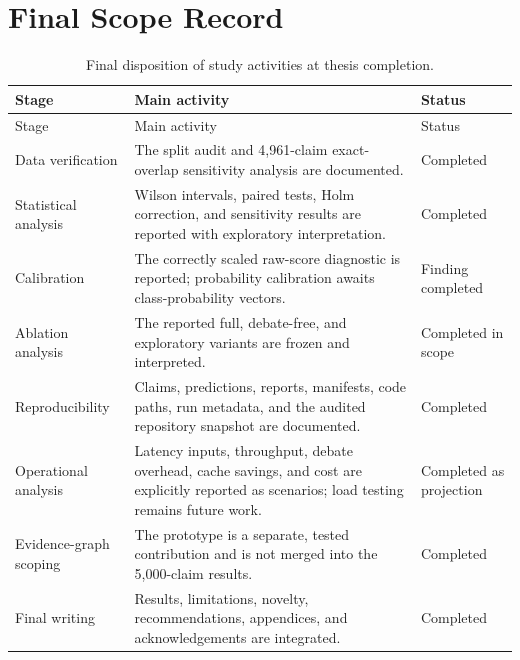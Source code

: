 \documentclass[12pt,a4paper,openany]{report}
\begin{document}
\section{Final Scope Record}
\begin{longtable}{p{3.6cm}p{6.3cm}p{2.6cm}}
\caption{Final disposition of study activities at thesis completion.}\\
\toprule Stage & Main activity & Status \\
\midrule
\endfirsthead
\toprule Stage & Main activity & Status \\
\midrule
\endhead
Data verification & The split audit and 4{,}961-claim exact-overlap sensitivity analysis are documented. & Completed \\
Statistical analysis & Wilson intervals, paired tests, Holm correction, and sensitivity results are reported with exploratory interpretation. & Completed \\
Calibration & The correctly scaled raw-score diagnostic is reported; probability calibration awaits class-probability vectors. & Finding completed \\
Ablation analysis & The reported full, debate-free, and exploratory variants are frozen and interpreted. & Completed in scope \\
Reproducibility & Claims, predictions, reports, manifests, code paths, run metadata, and the audited repository snapshot are documented. & Completed \\
Operational analysis & Latency inputs, throughput, debate overhead, cache savings, and cost are explicitly reported as scenarios; load testing remains future work. & Completed as projection \\
Evidence-graph scoping & The prototype is a separate, tested contribution and is not merged into the 5{,}000-claim results. & Completed \\
Final writing & Results, limitations, novelty, recommendations, appendices, and acknowledgements are integrated. & Completed \\
\bottomrule
\end{longtable}
\end{document}
